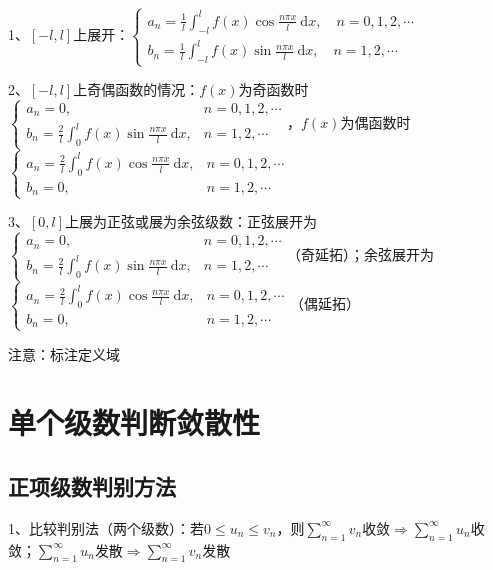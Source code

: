 1、$ [-l, l] $上展开：$ \left\{\begin{array}{l}

a_{n}=\frac{1}{l} \int_{-l}^{l} f(x) \cos \frac{n \pi x}{l} \mathrm{~d} x, \quad n=0,1,2, \cdots \\

b_{n}=\frac{1}{l} \int_{-l}^{l} f(x) \sin \frac{n \pi x}{l} \mathrm{~d} x, \quad n=1,2, \cdots

\end{array}\right. $

2、$ [-l, l] $上奇偶函数的情况：$ f(x) $为奇函数时$ \begin{cases}a_{n}=0, & n=0,1,2, \cdots \\ b_{n}=\frac{2}{l} \int_{0}^{l} f(x) \sin \frac{n \pi x}{l} \mathrm{~d} x, & n=1,2, \cdots\end{cases} $，$ f(x) $为偶函数时$ \begin{cases}a_{n}=\frac{2}{l} \int_{0}^{l} f(x) \cos \frac{n \pi x}{l} \mathrm{~d} x, & n=0,1,2, \cdots \\ b_{n}=0, & n=1,2, \cdots\end{cases} $

3、$ [0, l] $上展为正弦或展为余弦级数：正弦展开为$ \begin{cases}a_{n}=0, & n=0,1,2, \cdots \\ b_{n}=\frac{2}{l} \int_{0}^{l} f(x) \sin \frac{n \pi x}{l} \mathrm{~d} x, & n=1,2, \cdots\end{cases} $（奇延拓）；余弦展开为$ \begin{cases}a_{n}=\frac{2}{l} \int_{0}^{l} f(x) \cos \frac{n \pi x}{l} \mathrm{~d} x, & n=0,1,2, \cdots \\ b_{n}=0, & n=1,2, \cdots\end{cases} $（偶延拓）

注意：标注定义域

\section{单个级数判断敛散性}



\subsection{正项级数判别方法}

1、比较判别法（两个级数）：若$ 0 \leqslant u_{n} \leqslant v_{n} $，则$ \sum_{n=1}^{\infty} v_{n} $收敛$ \Rightarrow \sum_{n=1}^{\infty} u_{n} $收敛；$ \sum_{n=1}^{\infty} u_{n} $发散$ \Rightarrow \sum_{n=1}^{\infty} v_{n} $发散

